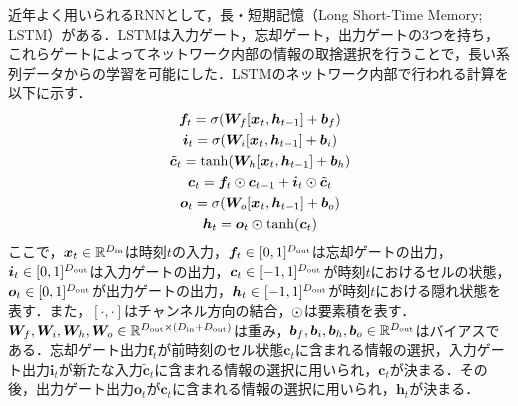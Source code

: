 \documentclass[12pt]{jarticle}
\numberwithin{equation}{section}    %
\numberwithin{figure}{section}      %
\numberwithin{table}{section}      %
\begin{document}
近年よく用いられるRNNとして，長・短期記憶（Long Short-Time Memory; LSTM）\cite{hochreiter1997long}がある．LSTMは入力ゲート，忘却ゲート，出力ゲートの3つを持ち，これらゲートによってネットワーク内部の情報の取捨選択を行うことで，長い系列データからの学習を可能にした．LSTMのネットワーク内部で行われる計算を以下に示す．
\begin{gather}
    \bm{f}_{t} = \sigma(\bm{W}_{f}[\bm{x}_{t}, \bm{h}_{t-1}] + \bm{b}_{f}) \\
    \bm{i}_{t} = \sigma(\bm{W}_{i}[\bm{x}_{t}, \bm{h}_{t-1}] + \bm{b}_{i}) \\
    \tilde{\bm{c}}_{t} = \tanh (\bm{W}_{h}[\bm{x}_{t}, \bm{h}_{t-1}] + \bm{b}_{h}) \\
    \bm{c}_{t} = \bm{f}_{t} \odot \bm{c}_{t-1} + \bm{i}_{t} \odot \tilde{\bm{c}}_{t} \\
    \bm{o}_{t} = \sigma(\bm{W}_{o}[\bm{x}_{t}, \bm{h}_{t-1}] + \bm{b}_{o}) \\
    \bm{h}_{t} = \bm{o}_{t} \odot \tanh(\bm{c}_{t})
\end{gather}
ここで，$\bm{x}_{t} \in \mathbb{R}^{D_{\text{in}}}$は時刻$t$の入力，$\bm{f}_{t} \in [0, 1]^{D_{\text{out}}}$は忘却ゲートの出力，$\bm{i}_{t} \in [0, 1]^{D_{\text{out}}}$は入力ゲートの出力，$\bm{c}_{t} \in [-1, 1]^{D_{\text{out}}}$が時刻$t$におけるセルの状態，$\bm{o}_{t} \in [0, 1]^{D_{\text{out}}}$が出力ゲートの出力，$\bm{h}_{t} \in [-1, 1]^{D_{\text{out}}}$が時刻$t$における隠れ状態を表す．また，$[\cdot, \cdot]$はチャンネル方向の結合，$\odot$は要素積を表す．$\bm{W}_{f}, \bm{W}_{i}, \bm{W}_{h}, \bm{W}_{o} \in \mathbb{R}^{D_{\text{out}} \times (D_{\text{in}} + D_{\text{out}})}$は重み，$\bm{b}_{f}, \bm{b}_{i}, \bm{b}_{h}, \bm{b}_{o} \in \mathbb{R}^{D_{\text{out}}}$はバイアスである．忘却ゲート出力$\bm{f}_{t}$が前時刻のセル状態$\bm{c}_{t}$に含まれる情報の選択，入力ゲート出力$\bm{i}_{t}$が新たな入力$\tilde{\bm{c}}_{t}$に含まれる情報の選択に用いられ，$\bm{c}_{t}$が決まる．その後，出力ゲート出力$\bm{o}_{t}$が$\bm{c}_{t}$に含まれる情報の選択に用いられ，$\bm{h}_{t}$が決まる．
\end{document}
